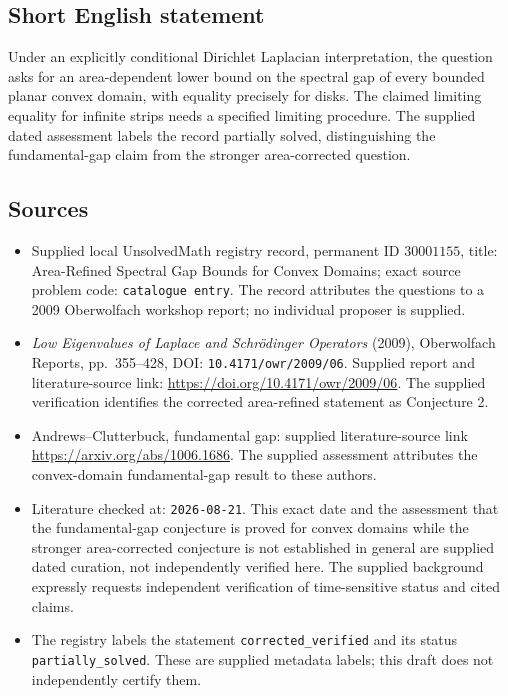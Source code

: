 \documentclass[11pt]{article}
\begin{document}
\subsection{Short English statement}
Under an explicitly conditional Dirichlet Laplacian interpretation, the question asks for an area-dependent lower bound on the spectral gap of every bounded planar convex domain, with equality precisely for disks. The claimed limiting equality for infinite strips needs a specified limiting procedure. The supplied dated assessment labels the record partially solved, distinguishing the fundamental-gap claim from the stronger area-corrected question.
\subsection{Sources}
\begin{itemize}
\item Supplied local UnsolvedMath registry record, permanent ID \(30001155\), title: Area-Refined Spectral Gap Bounds for Convex Domains; exact source problem code: \texttt{catalogue entry}. The record attributes the questions to a 2009 Oberwolfach workshop report; no individual proposer is supplied.
\item \emph{Low Eigenvalues of Laplace and Schrödinger Operators} (2009), Oberwolfach Reports, pp.\ 355--428, DOI: \texttt{10.4171/owr/2009/06}. Supplied report and literature-source link: \url{https://doi.org/10.4171/owr/2009/06}. The supplied verification identifies the corrected area-refined statement as Conjecture 2.
\item Andrews--Clutterbuck, fundamental gap: supplied literature-source link \url{https://arxiv.org/abs/1006.1686}. The supplied assessment attributes the convex-domain fundamental-gap result to these authors.
\item Literature checked at: \texttt{2026-08-21}. This exact date and the assessment that the fundamental-gap conjecture is proved for convex domains while the stronger area-corrected conjecture is not established in general are supplied dated curation, not independently verified here. The supplied background expressly requests independent verification of time-sensitive status and cited claims.
\item The registry labels the statement \texttt{corrected\_verified} and its status \texttt{partially\_solved}. These are supplied metadata labels; this draft does not independently certify them.
\end{itemize}
\end{document}
